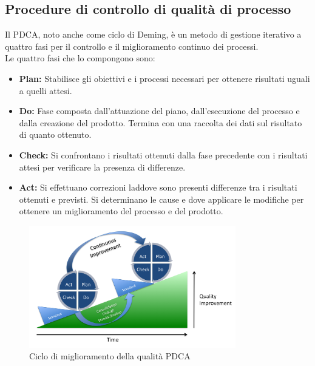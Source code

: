 	\subsection{Procedure di controllo di qualità di processo}
	Il PDCA, noto anche come ciclo di Deming, è un metodo di gestione iterativo a quattro fasi per il controllo e il miglioramento continuo dei processi.\\
	Le quattro fasi che lo compongono sono:
		\begin{itemize}
			\item \textbf{Plan:} \textnormal{Stabilisce gli obiettivi e i processi necessari per ottenere risultati uguali a quelli attesi.}
			\item \textbf{Do:} \textnormal{Fase composta dall'attuazione del piano, dall'esecuzione del processo e dalla creazione del prodotto. Termina con una raccolta dei dati sul risultato di quanto ottenuto.}
			\item \textbf{Check:} \textnormal{Si confrontano i risultati ottenuti dalla fase precedente con i risultati attesi per verificare la presenza di differenze.}
			\item \textbf{Act:} \textnormal{Si effettuano correzioni laddove sono presenti differenze tra i risultati ottenuti e previsti. Si determinano le cause e dove applicare le modifiche per ottenere un miglioramento del processo e del prodotto.}
		\end{itemize}
		\begin{figure}[h]
			\centering
			\includegraphics[width=90mm]{images/pdca.png}
			\caption{Ciclo di miglioramento della qualità PDCA}
		\end{figure}
	
